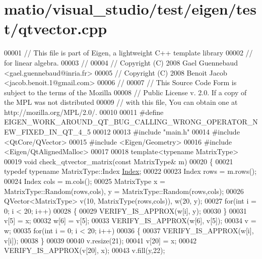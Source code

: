 \hypertarget{matio_2visual__studio_2test_2eigen_2test_2qtvector_8cpp_source}{}\section{matio/visual\+\_\+studio/test/eigen/test/qtvector.cpp}
\label{matio_2visual__studio_2test_2eigen_2test_2qtvector_8cpp_source}

\begin{DoxyCode}
00001 \textcolor{comment}{// This file is part of Eigen, a lightweight C++ template library}
00002 \textcolor{comment}{// for linear algebra.}
00003 \textcolor{comment}{//}
00004 \textcolor{comment}{// Copyright (C) 2008 Gael Guennebaud <gael.guennebaud@inria.fr>}
00005 \textcolor{comment}{// Copyright (C) 2008 Benoit Jacob <jacob.benoit.1@gmail.com>}
00006 \textcolor{comment}{//}
00007 \textcolor{comment}{// This Source Code Form is subject to the terms of the Mozilla}
00008 \textcolor{comment}{// Public License v. 2.0. If a copy of the MPL was not distributed}
00009 \textcolor{comment}{// with this file, You can obtain one at http://mozilla.org/MPL/2.0/.}
00010 
00011 \textcolor{preprocessor}{#define EIGEN\_WORK\_AROUND\_QT\_BUG\_CALLING\_WRONG\_OPERATOR\_NEW\_FIXED\_IN\_QT\_4\_5}
00012 
00013 \textcolor{preprocessor}{#include "main.h"}
00014 \textcolor{preprocessor}{#include <QtCore/QVector>}
00015 \textcolor{preprocessor}{#include <Eigen/Geometry>}
00016 \textcolor{preprocessor}{#include <Eigen/QtAlignedMalloc>}
00017 
00018 \textcolor{keyword}{template}<\textcolor{keyword}{typename} MatrixType>
00019 \textcolor{keywordtype}{void} check\_qtvector\_matrix(\textcolor{keyword}{const} MatrixType& m)
00020 \{
00021   \textcolor{keyword}{typedef} \textcolor{keyword}{typename} MatrixType::Index \hyperlink{namespace_eigen_a62e77e0933482dafde8fe197d9a2cfde}{Index};
00022 
00023   Index rows = m.rows();
00024   Index cols = m.cols();
00025   MatrixType x = MatrixType::Random(rows,cols), y = MatrixType::Random(rows,cols);
00026   QVector<MatrixType> v(10, MatrixType(rows,cols)), w(20, y);
00027   \textcolor{keywordflow}{for}(\textcolor{keywordtype}{int} i = 0; i < 20; i++)
00028   \{
00029     VERIFY\_IS\_APPROX(w[i], y);
00030   \}
00031   v[5] = x;
00032   w[6] = v[5];
00033   VERIFY\_IS\_APPROX(w[6], v[5]);
00034   v = w;
00035   \textcolor{keywordflow}{for}(\textcolor{keywordtype}{int} i = 0; i < 20; i++)
00036   \{
00037     VERIFY\_IS\_APPROX(w[i], v[i]);
00038   \}
00039 
00040   v.resize(21);
00041   v[20] = x;
00042   VERIFY\_IS\_APPROX(v[20], x);
00043   v.fill(y,22);

\end{DoxyCode}
